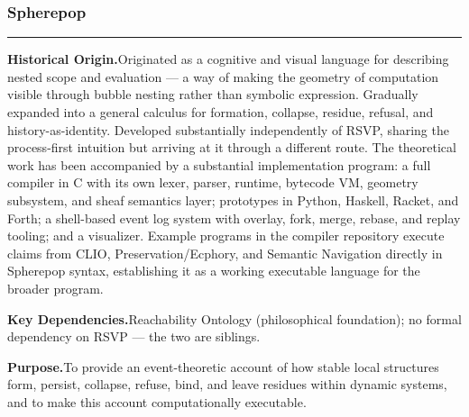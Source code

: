 \documentclass[12pt, twoside]{article}
\newcommand{\frameworkhead}[5]{  \subsubsection{#1}
  \noindent\textcolor{#2}{\rule{\linewidth}{0.8pt}}
  \smallskip

  \noindent\textbf{Historical Origin.}\quad #3

  \noindent\textbf{Key Dependencies.}\quad #4

  \noindent\textbf{Purpose.}\quad #5
}
\begin{document}
\frameworkhead{Spherepop}{spherered}{Originated as a cognitive and visual language for describing nested scope
and evaluation — a way of making the geometry of computation visible through
bubble nesting rather than symbolic expression. Gradually expanded into a
general calculus for formation, collapse, residue, refusal, and
history-as-identity. Developed substantially independently of RSVP, sharing
the process-first intuition but arriving at it through a different route.
The theoretical work has been accompanied by a substantial implementation
program: a full compiler in C with its own lexer, parser, runtime, bytecode
VM, geometry subsystem, and sheaf semantics layer; prototypes in Python,
Haskell, Racket, and Forth; a shell-based event log system with overlay,
fork, merge, rebase, and replay tooling; and a visualizer. Example programs
in the compiler repository execute claims from CLIO, Preservation/Ecphory,
and Semantic Navigation directly in Spherepop syntax, establishing it as
a working executable language for the broader program.}{Reachability Ontology (philosophical foundation); no formal dependency on
RSVP — the two are siblings.}{To provide an event-theoretic account of how stable local structures form,
persist, collapse, refuse, bind, and leave residues within dynamic systems,
and to make this account computationally executable.}
\end{document}

